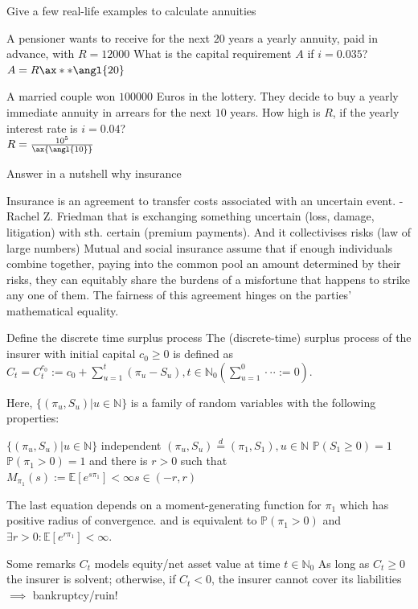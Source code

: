 \documentclass[11pt,a4paper,twoside]{article}
\begin{document}
Give a few real-life examples to calculate annuities

A pensioner wants to receive for the next $20$ years a yearly annuity,
paid in advance, with $R = 12 000$ What is the capital
requirement $A$ if $i = 0.035$? \\
$ A = R\ax**{\angl{20}}$

A married couple won $100 000$ Euros in the lottery. They decide to
buy a yearly immediate annuity in arrears for the next $10$ years.
How high is $R$, if the yearly interest rate is $i = 0.04$? \\
$R = \frac{10^5}{\ax{\angl{10}}}$


Answer in a nutshell why insurance

Insurance is an agreement to transfer costs associated with an uncertain event.
- Rachel Z. Friedman
that is exchanging something uncertain (loss, damage, litigation) with sth. certain (premium payments).
And it collectivises risks (law of large numbers)
Mutual and social insurance assume that if enough individuals combine together, paying into
the common pool an amount determined by their risks, they can equitably share the burdens
of a misfortune that happens to strike any one of them. The fairness of this agreement hinges
on the parties’ mathematical equality.



Define the discrete time surplus process
The (discrete-time) surplus process of the insurer with initial capital \(c_0 \ge 0\) is defined as
\(C_t = C_t^{c_0} := c_0 + \sum_{u = 1}^t (\pi_u - S_u), t \in \mathbb{N}_0 \left( \sum_{u = 1}^0 \cdot \cdot \cdot := 0 \right)\).

Here, \(\{(\pi_u, S_u)|u \in \mathbb{N}\}\) is a family of random variables with the following properties:

\(\{(\pi_u, S_u)|u \in \mathbb{N}\}\) independent
\((\pi_u, S_u) \stackrel{d}{=} (\pi_1, S_1), u \in \mathbb{N}\)
\(\mathbb{P}(S_1 \ge 0) = 1\)
\(\mathbb{P}(\pi_1 > 0) = 1\) and there is \(r > 0\) such that \(M_{\pi_1}(s) := \mathbb{E}[e^{s \pi_1}] < \infty s \in (-r, r)\)

The last equation depends on a moment-generating function for \( \pi_1 \) which has positive radius of convergence.
and is equivalent to \( \mathbb{P}(\pi_1 > 0) \) and \( \exists r > 0: \mathbb{E}[e^{r\pi_1}] < \infty \).


Some remarks
\( C_t \) models equity/net asset value at time \( t \in \mathbb{N}_0 \)
As long as \( C_t \geq 0 \) the insurer is solvent; otherwise, if \( C_t < 0 \), the insurer cannot cover its
liabilities \( \implies \) bankruptcy/ruin!
\end{document}
